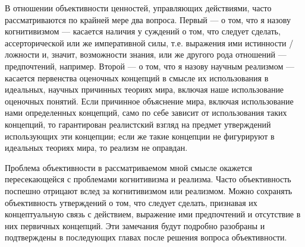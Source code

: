 \documentclass[11pt]{book}
\begin{document}
В отношении объективности ценностей, управляющих действиями, часто рассматриваются по крайней мере два вопроса. Первый --- о том, что я назову когнитивизмом --- касается наличия у суждений о том, что следует сделать, ассерторической или же императивной силы, т.е. выражения ими истинности / ложности и, значит, возможности знания, или же другого рода отношений --- предпочтений, например. Второй --- о том, что я назову научным реализмом --- касается первенства оценочных концепций в смысле их использования в идеальных, научных причинных теориях мира, включая наше использование оценочных понятий. Если причинное объяснение мира, включая использование нами определенных концепций, само по себе зависит от использования таких концепций, то гарантирован реалистский взгляд на предмет утверждений использующих эти концепции; если же такие концепции не фигурируют в идеальных теориях мира, то реализм не оправдан.

Проблема объективности в рассматриваемом мной смысле окажется пересекающейся с проблемами когнитивизма и реализма. Часто объективность поспешно отрицают вслед за когнитивизмом или реализмом. Можно сохранять объективность утверждений о том, что следует сделать, признавая их концептуальную связь с действием, выражение ими предпочтений и отсутствие в них первичных концепций. Эти замечания будут подробно разобраны и подтверждены в последующих главах после решения вопроса объективности.
\end{document}
